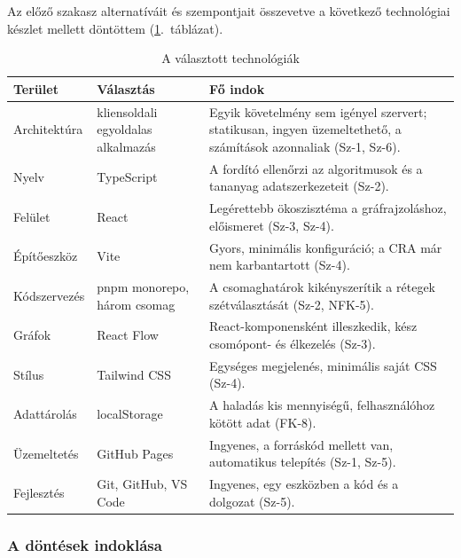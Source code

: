Az előző szakasz alternatíváit és szempontjait összevetve a
következő technológiai készlet mellett döntöttem
(\ref{tab:tech}.~táblázat).

\begin{table}[H]
    \centering
    \begin{tabularx}{\textwidth}{|>{\raggedright\arraybackslash}p{2.5cm}|>{\raggedright\arraybackslash}p{3cm}|X|}
        \hline
        \textbf{Terület} & \textbf{Választás} & \textbf{Fő indok} \\ \hline
        Architektúra & kliensoldali egyoldalas alkalmazás &
            Egyik követelmény sem igényel szervert; statikusan, ingyen
            üzemeltethető, a számítások azonnaliak (Sz-1, Sz-6). \\ \hline
        Nyelv & TypeScript &
            A fordító ellenőrzi az algoritmusok és a tananyag
            adatszerkezeteit (Sz-2). \\ \hline
        Felület & React &
            Legérettebb ökoszisztéma a gráfrajzoláshoz, előismeret
            (Sz-3, Sz-4). \\ \hline
        Építőeszköz & Vite &
            Gyors, minimális konfiguráció; a CRA már nem karbantartott
            (Sz-4). \\ \hline
        Kódszervezés & pnpm monorepo, három csomag &
            A csomaghatárok kikényszerítik a rétegek szétválasztását
            (Sz-2, NFK-5). \\ \hline
        Gráfok & React Flow &
            React-komponensként illeszkedik, kész csomópont- és
            élkezelés (Sz-3). \\ \hline
        Stílus & Tailwind CSS &
            Egységes megjelenés, minimális saját CSS (Sz-4). \\ \hline
        Adattárolás & localStorage &
            A haladás kis mennyiségű, felhasználóhoz kötött adat
            (FK-8). \\ \hline
        Üzemeltetés & GitHub Pages &
            Ingyenes, a forráskód mellett van, automatikus telepítés
            (Sz-1, Sz-5). \\ \hline
        Fejlesztés & Git, GitHub, VS Code &
            Ingyenes, egy eszközben a kód és a dolgozat (Sz-5). \\ \hline
    \end{tabularx}
    \caption{A választott technológiák}
    \label{tab:tech}
\end{table}

\subsubsection{A döntések indoklása}

